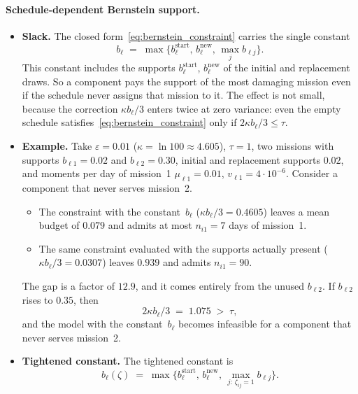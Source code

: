 \documentclass[11pt,a4paper]{article}
\theoremstyle{plain}
\theoremstyle{definition}
\theoremstyle{remark}
\begin{document}
\paragraph{Schedule-dependent Bernstein support.}
\begin{itemize}
  \item \textbf{Slack.} The closed form~\eqref{eq:bernstein_constraint} carries the single constant
    \begin{equation}
      b_\ell \;=\; \max\{b^{\mathrm{start}}_\ell,\, b^{\mathrm{new}}_\ell,\, \max_j b_{\ell j}\}.
    \end{equation}
    This constant includes the supports $b^{\mathrm{start}}_\ell$, $b^{\mathrm{new}}_\ell$ of the initial and replacement draws.
    So a component pays the support of the most damaging mission even if the schedule never assigns that mission to it.
    The effect is not small, because the correction $\kappa b_\ell/3$ enters twice at zero variance: even the empty schedule satisfies~\eqref{eq:bernstein_constraint} only if $2\kappa b_\ell/3 \le \tau$.
  \item \textbf{Example.} Take $\varepsilon = 0.01$ ($\kappa = \ln 100 \approx 4.605$), $\tau = 1$, two missions with supports $b_{\ell 1} = 0.02$ and $b_{\ell 2} = 0.30$, initial and replacement supports $0.02$, and moments per day of mission~1 $\mu_{\ell 1} = 0.01$, $v_{\ell 1} = 4\cdot 10^{-6}$.
    Consider a component that never serves mission~2.
    \begin{itemize}
      \item The constraint with the constant~$b_\ell$ ($\kappa b_\ell/3 = 0.4605$) leaves a mean budget of $0.079$ and admits at most $n_{i1} = 7$ days of mission~1.
      \item The same constraint evaluated with the supports actually present ($\kappa b_\ell/3 = 0.0307$) leaves $0.939$ and admits $n_{i1} = 90$.
    \end{itemize}
    The gap is a factor of $12.9$, and it comes entirely from the unused $b_{\ell 2}$.
    If $b_{\ell 2}$ rises to $0.35$, then
    \begin{equation}
      2\kappa b_\ell/3 \;=\; 1.075 \;>\; \tau,
    \end{equation}
    and the model with the constant~$b_\ell$ becomes infeasible for a component that never serves mission~2.
  \item \textbf{Tightened constant.} The tightened constant is
    \begin{equation}
      b_\ell(\zeta) \;=\; \max\bigl\{b^{\mathrm{start}}_\ell,\, b^{\mathrm{new}}_\ell,\, \max_{j:\,\zeta_{ij}=1} b_{\ell j}\bigr\}.

\end{equation}
\end{itemize}
\end{document}
